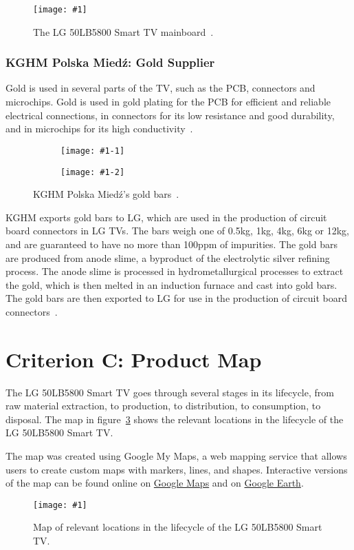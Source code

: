 \documentclass[12pt, letterpaper]{article}
\newcommand{\img}[2]{
  \begin{figure}[H]
    \medskip
    \centering
    \texttt{[image: \#1]}
    \caption{#2}
    \medskip\label{fig:#1}
  \end{figure}
}
\newcommand{\imgs}[2]{
  \begin{figure}[H]
    \medskip
    \begin{subfigure}{.5\textwidth}
      \centering
      \texttt{[image: \#1-1]}
    \end{subfigure}%
    \begin{subfigure}{.5\textwidth}
      \centering
      \texttt{[image: \#1-2]}
    \end{subfigure}
    \caption{#2}
    \medskip\label{fig:#1}
  \end{figure}
}
\begin{document}
\img{EBT62999602}{The LG 50LB5800 Smart TV
mainboard~\autocite{tv-parts-canada-2024}.}

\subsubsection{KGHM Polska Mied\'z: Gold Supplier}

Gold is used in several parts of the TV, such as the PCB, connectors
and microchips. Gold is used in gold plating for the PCB for
efficient and reliable electrical connections, in connectors for its
low resistance and good durability, and in microchips for its high
conductivity~\autocite{elmore-2024}.

\imgs{kghm-gold}{KGHM Polska Mied\'z's gold
bars~\autocite{kghm-polska-miedz-no-dateB}.}

KGHM exports gold bars to LG, which are used in the production of
circuit board connectors in LG TVs. The bars weigh one of 0.5kg, 1kg,
4kg, 6kg or 12kg, and are guaranteed to have no more than 100ppm of
impurities. The gold bars are produced from anode slime, a byproduct
of the electrolytic silver refining process. The anode slime is
processed in hydrometallurgical processes to extract the gold, which
is then melted in an induction furnace and cast into gold bars. The
gold bars are then exported to LG for use in the production of
circuit board connectors~\autocite{kghm-polska-miedz-no-dateB}.

\section{Criterion C: Product Map}

The LG 50LB5800 Smart TV goes through several stages in its lifecycle,
from raw material extraction, to production, to distribution, to
consumption, to disposal. The map in figure~\ref{fig:lg-map} shows the
relevant locations in the lifecycle of the LG 50LB5800 Smart TV.\@

The map was created using Google My Maps, a web mapping service that
allows users to create custom maps with markers, lines, and shapes.
Interactive versions of the map can be found online on
\href{https://www.google.com/maps/d/edit?mid=1_aeai9S8RSvkTi9m7rJfM217r6kOGgc&usp=sharing}{Google
Maps} and on
\href{https://www.google.com/maps/d/earth?mid=1_aeai9S8RSvkTi9m7rJfM217r6kOGgc}{Google
Earth}.

\img{lg-map}{Map of relevant locations in the lifecycle of the LG
50LB5800 Smart TV.}
\end{document}
